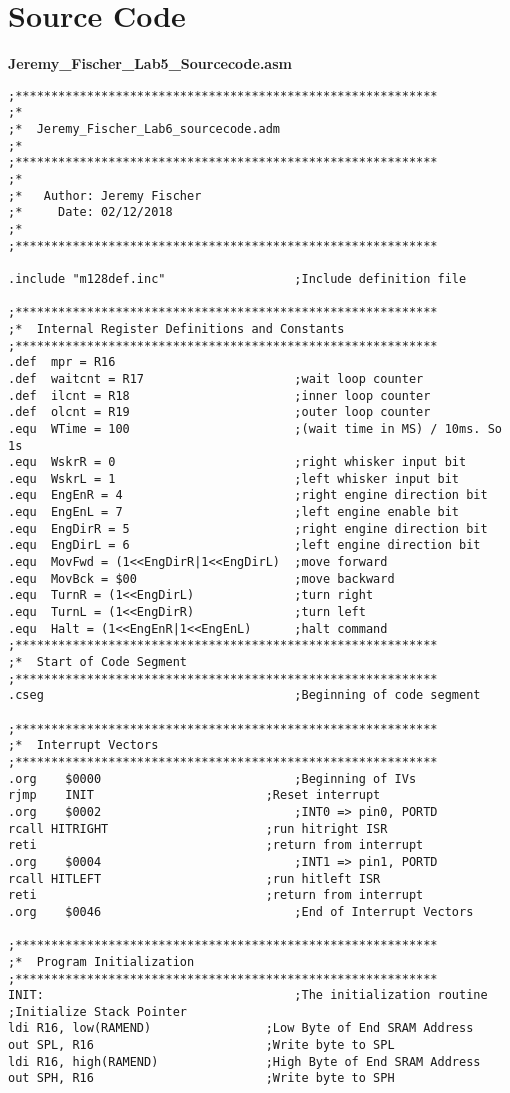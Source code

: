 \documentclass[12pt,letterpaper]{article}
\begin{document}
\section{Source Code}
	\textbf{Jeremy\_Fischer\_Lab5\_Sourcecode.asm}
	\begin{verbatim}
;***********************************************************
;*
;*	Jeremy_Fischer_Lab6_sourcecode.adm
;*
;***********************************************************
;*
;*	 Author: Jeremy Fischer
;*	   Date: 02/12/2018
;*
;***********************************************************

.include "m128def.inc"					;Include definition file

;***********************************************************
;*	Internal Register Definitions and Constants
;***********************************************************
.def  mpr = R16
.def  waitcnt = R17						;wait loop counter
.def  ilcnt = R18						;inner loop counter
.def  olcnt = R19						;outer loop counter
.equ  WTime = 100						;(wait time in MS) / 10ms. So 1s
.equ  WskrR = 0							;right whisker input bit
.equ  WskrL = 1							;left whisker input bit
.equ  EngEnR = 4						;right engine direction bit
.equ  EngEnL = 7						;left engine enable bit
.equ  EngDirR = 5						;right engine direction bit
.equ  EngDirL = 6						;left engine direction bit
.equ  MovFwd = (1<<EngDirR|1<<EngDirL)  ;move forward
.equ  MovBck = $00						;move backward
.equ  TurnR = (1<<EngDirL)				;turn right
.equ  TurnL = (1<<EngDirR)				;turn left	
.equ  Halt = (1<<EngEnR|1<<EngEnL)		;halt command
;***********************************************************
;*	Start of Code Segment
;***********************************************************
.cseg									;Beginning of code segment

;***********************************************************
;*	Interrupt Vectors
;***********************************************************
.org	$0000							;Beginning of IVs
rjmp 	INIT						;Reset interrupt
.org	$0002							;INT0 => pin0, PORTD
rcall HITRIGHT						;run hitright ISR
reti								;return from interrupt
.org	$0004							;INT1 => pin1, PORTD
rcall HITLEFT						;run hitleft ISR
reti								;return from interrupt
.org	$0046							;End of Interrupt Vectors

;***********************************************************
;*	Program Initialization
;***********************************************************
INIT:									;The initialization routine
;Initialize Stack Pointer
ldi R16, low(RAMEND) 				;Low Byte of End SRAM Address
out SPL, R16 						;Write byte to SPL
ldi R16, high(RAMEND) 				;High Byte of End SRAM Address
out SPH, R16 						;Write byte to SPH	


\end{verbatim}
\end{document}
